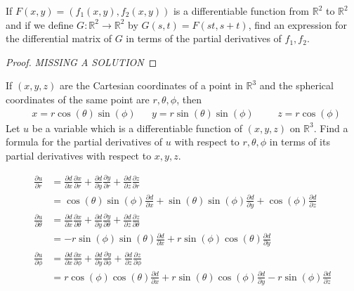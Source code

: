 \documentclass[12pt]{book}
\newcommand{\R}{\mathbb{R}}
\newenvironment{exercise}[2][Exercise]{\begin{trivlist}
\item[\hskip \labelsep {\bfseries #1}\hskip \labelsep {\bfseries #2.}]}{\end{trivlist}}
\begin{document}
\begin{exercise}{9.3.8}
	If $F(x,y) = \left( f_1 (x,y), f_2 (x, y) \right)$ is a differentiable function from $\R^2$ to $\R^2$ and if we define $G: \R^2 \to \R^2$ by $G(s, t) = F(s t, s+t)$, find an expression for the differential matrix of $G$ in terms of the partial derivatives of $f_1, f_2$.

	\begin{proof}
	\emph{MISSING A SOLUTION}
	\end{proof}
\end{exercise}



\begin{exercise}{9.3.9}
	If $(x,y,z)$ are the Cartesian coordinates of a point in $\R^3$ and the spherical coordinates of the same point are $r, \theta, \phi$, then 
		\begin{align*} &x = r \cos(\theta) \sin(\phi)  &&y = r \sin(\theta) \sin(\phi) &&&z = r \cos(\phi) \end{align*}
	Let $u$ be a variable which is a differentiable  function of $(x,y,z)$ on $\R^3$. Find a formula for the partial derivatives of $u$ with respect to $r, \theta, \phi$ in terms of its partial derivatives with respect to $x,y,z$.

	\begin{align*}
	\frac{\partial u}{\partial r} &= \frac{\partial d}{\partial x} \frac{\partial x}{\partial r} + \frac{\partial d }{\partial y} \frac{\partial y}{\partial r} + \frac{\partial d}{\partial z} \frac{\partial z}{\partial r} \\
	&= \cos(\theta) \sin(\phi) \frac{\partial d}{\partial x} + \sin(\theta) \sin(\phi) \frac{\partial d}{\partial y} + \cos(\phi) \frac{\partial d}{\partial z} \\
	\frac{\partial u}{\partial \theta} &= \frac{\partial d}{\partial x} \frac{\partial x}{\partial \theta} + \frac{\partial d }{\partial y} \frac{\partial y}{\partial \theta} + \frac{\partial d}{\partial z} \frac{\partial z}{\partial \theta}\\
	&= - r \sin{\left (\phi \right )} \sin{\left (\theta \right )} \frac{\partial d}{\partial x} + r \sin{\left (\phi \right )} \cos{\left (\theta \right )} \frac{\partial d}{\partial y}  \\
	\frac{\partial u}{\partial \phi} &= \frac{\partial d}{\partial x} \frac{\partial x}{\partial \phi} + \frac{\partial d }{\partial y} \frac{\partial y}{\partial \phi} + \frac{\partial d}{\partial z} \frac{\partial z}{\partial \phi} \\
	&= r \cos{\left (\phi \right )} \cos{\left (\theta \right )} \frac{\partial d}{\partial x} + r \sin{\left (\theta \right )} \cos{\left (\phi \right )} \frac{\partial d}{\partial y} - r \sin{\left (\phi \right )} \frac{\partial d}{\partial z}
	\end{align*}
\end{exercise}
\end{document}
